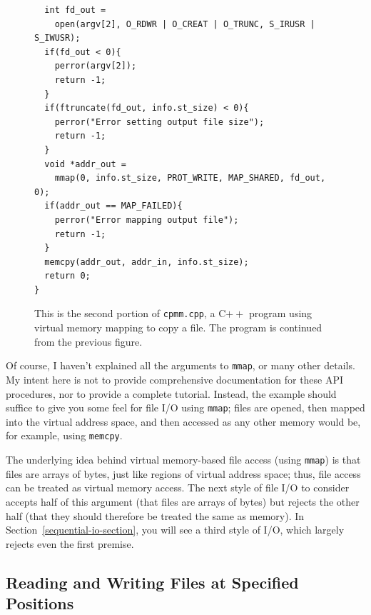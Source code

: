 \begin{figure}
\begin{verbatim}
  int fd_out =
    open(argv[2], O_RDWR | O_CREAT | O_TRUNC, S_IRUSR | S_IWUSR);
  if(fd_out < 0){
    perror(argv[2]);
    return -1;
  }
  if(ftruncate(fd_out, info.st_size) < 0){
    perror("Error setting output file size");
    return -1;
  }
  void *addr_out =
    mmap(0, info.st_size, PROT_WRITE, MAP_SHARED, fd_out, 0);
  if(addr_out == MAP_FAILED){
    perror("Error mapping output file");
    return -1;
  }
  memcpy(addr_out, addr_in, info.st_size);
  return 0;
}
\end{verbatim}
\caption{This is the second portion of {\tt cpmm.cpp}, a C$++$ program using virtual
  memory mapping to copy a file. The program is continued from the previous figure.}
\label{cpmm-source2}
\end{figure}

Of course, I haven't explained all the arguments to \verb|mmap|, or
many other details.  My intent here is not to provide comprehensive
documentation for these API procedures, nor to provide a complete
tutorial.  Instead, the example should suffice to give you some feel
for file I/O using \verb|mmap|; files are opened, then mapped into the virtual
address space, and then accessed as any other memory would be, for example,
using \verb|memcpy|.

The underlying idea behind virtual memory-based file access (using
\verb|mmap|) is that files are arrays of bytes, just like
regions of virtual address space; thus, file access can be treated as
virtual memory access.  The next style of file I/O to consider
accepts half of this argument (that files are arrays of bytes) but
rejects the other half (that they should therefore be treated the same
as memory).  In Section~\ref{sequential-io-section}, you will see a third style of I/O, which largely
rejects even the first premise.

\subsection{Reading and Writing Files at Specified Positions}

